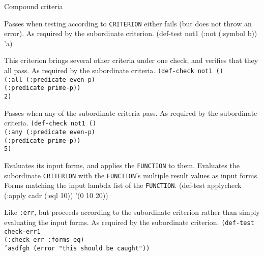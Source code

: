 \begin{criteriaGroup}{Compound criteria}{}

{Passes when testing according to \texttt{CRITERION} either fails (but
does not throw an error).}
{As required by the subordinate criterion.}
{\noExpl}
{\singleEx}{(def-test not1 (:not (:symbol b)) 'a)}

{This criterion brings several other criteria under one check, and
verifies that they all pass.}
{As required by the subordinate criteria.}
{\noExpl}
{\tabbingEx}{\texttt{(de}\=\texttt{f-}\=\texttt{check not1 ()}
\\ \>\>\texttt{(:all }\=\texttt{(:predicate even-p)}
\\ \>\>\>\texttt{(:predicate prime-p))}
\\ \>\texttt{2)}}

{Passes when any of the subordinate criteria pass.}
{As required by the subordinate criteria.}
{\noExpl}
{\tabbingEx}{
\texttt{(de}\=\texttt{f-}\=\texttt{check not1 ()}
\\ \>\>\texttt{(:any }\=\texttt{(:predicate even-p)}
\\ \>\>\>\texttt{(:predicate prime-p))}
\\ \>\texttt{5)}}

{Evaluates its input forms, and applies the \texttt{FUNCTION} to them.
Evaluates the subordinate \texttt{CRITERION} with the
\texttt{FUNCTION}'s multiple result values as input forms.}
{Forms matching the input lambda list of the \texttt{FUNCTION}.}
{\noExpl}
{\singleEx}{(def-test applycheck (:apply cadr (:eql 10)) '(0 10 20))}

{Like \texttt{:err}, but proceeds according to the subordinate
criterion rather than simply evaluating the input forms.}
{As required by the subordinate criterion.}
{}
{\tabbingEx}
{\texttt{(de}\=\texttt{f-}\=\texttt{test check-err1}
\\ \> \> \texttt{(:check-err :forms-eq)}
\\ \> \texttt{'asdfgh (error "this should be caught"))}}


\end{criteriaGroup}
